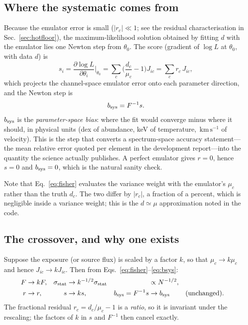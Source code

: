 \documentclass[11pt,a4paper]{article}
\newcommand{\kms}{\,\mathrm{km\,s^{-1}}}
\begin{document}
\subsection{Where the systematic comes from}
Because the emulator error is small ($|r_c|\ll1$; see the residual
characterisation in Sec.~\ref{sec:hotfloor}), the maximum-likelihood solution
obtained by fitting $d$ with the emulator lies one Newton step from $\theta_0$.
The score (gradient of $\log L$ at $\theta_0$, with data $d$) is
\begin{equation}
s_i = \frac{\partial \log L}{\partial\theta_i}\bigg|_{\theta_0}
    = \sum_c \Big(\frac{d_c}{\mu_c}-1\Big) J_{ic}
    = \sum_c r_c\, J_{ic},
\label{eq:score}
\end{equation}
which projects the channel-space emulator error onto each parameter direction,
and the Newton step is
\begin{equation}
b_{\rm sys} = F^{-1} s .
\label{eq:bsys}
\end{equation}
$b_{\rm sys}$ is the \emph{parameter-space bias}: where the fit would converge
minus where it should, in physical units (dex of abundance, keV of temperature,
$\kms$ of velocity). This is the step that converts a spectrum-space accuracy
statement---the mean relative error quoted per element in the development
report---into the quantity the science actually publishes. A perfect emulator
gives $r=0$, hence $s=0$ and $b_{\rm sys}=0$, which is the natural sanity check.

Note that Eq.~\eqref{eq:fisher} evaluates the variance weight with the
emulator's $\mu_c$ rather than the truth $d_c$. The two differ by $|r_c|$, a
fraction of a percent, which is negligible inside a variance weight; this is the
$d\simeq\mu$ approximation noted in the code.

\subsection{The crossover, and why one exists}
Suppose the exposure (or source flux) is scaled by a factor $k$, so that
$\mu_c \to k\mu_c$ and hence $J_{ic} \to kJ_{ic}$. Then from
Eqs.~\eqref{eq:fisher}--\eqref{eq:bsys}:
\begin{align}
F &\to kF, & \sigma_{\rm stat} &\to k^{-1/2}\sigma_{\rm stat}
   &&\propto N^{-1/2}, \nonumber\\
r &\to r, & s &\to ks, & b_{\rm sys} = F^{-1}s &\to b_{\rm sys}
   &&\text{(unchanged).}
\label{eq:scaling}
\end{align}
The fractional residual $r_c=d_c/\mu_c-1$ is a \emph{ratio}, so it is invariant
under the rescaling; the factors of $k$ in $s$ and $F^{-1}$ then cancel exactly.
\end{document}
